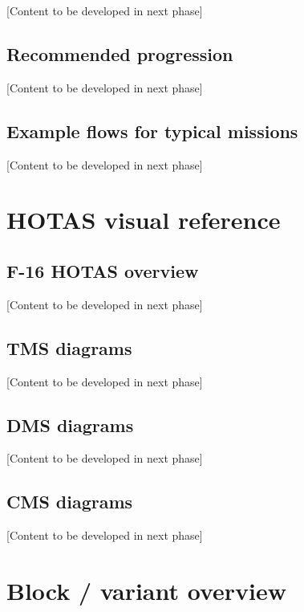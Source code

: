 \documentclass[11pt,a4paper]{article}
\begin{document}
[Content to be developed in next phase]

\subsection{Recommended progression}

[Content to be developed in next phase]

\subsection{Example flows for typical missions}

[Content to be developed in next phase]

\section{HOTAS visual reference}
\subsection{F-16 HOTAS overview}

[Content to be developed in next phase]

\subsection{TMS diagrams}

[Content to be developed in next phase]

\subsection{DMS diagrams}

[Content to be developed in next phase]

\subsection{CMS diagrams}

[Content to be developed in next phase]

\appendix

\section{Block / variant overview}
\end{document}
